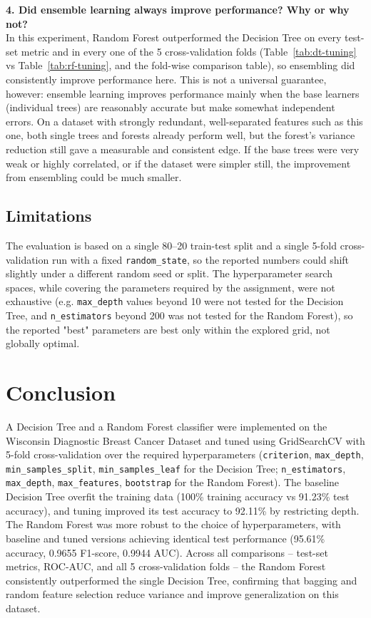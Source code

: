 \documentclass[12pt,a4paper]{article}
\begin{document}
\textbf{4. Did ensemble learning always improve performance? Why or why not?}\\
In this experiment, Random Forest outperformed the Decision Tree on every test-set metric and in every one of the 5 cross-validation folds (Table~\ref{tab:dt-tuning} vs Table~\ref{tab:rf-tuning}, and the fold-wise comparison table), so ensembling did consistently improve performance here. This is not a universal guarantee, however: ensemble learning improves performance mainly when the base learners (individual trees) are reasonably accurate but make somewhat independent errors. On a dataset with strongly redundant, well-separated features such as this one, both single trees and forests already perform well, but the forest's variance reduction still gave a measurable and consistent edge. If the base trees were very weak or highly correlated, or if the dataset were simpler still, the improvement from ensembling could be much smaller.

\subsection{Limitations}
The evaluation is based on a single 80--20 train-test split and a single 5-fold cross-validation run with a fixed \texttt{random\_state}, so the reported numbers could shift slightly under a different random seed or split. The hyperparameter search spaces, while covering the parameters required by the assignment, were not exhaustive (e.g. \texttt{max\_depth} values beyond 10 were not tested for the Decision Tree, and \texttt{n\_estimators} beyond 200 was not tested for the Random Forest), so the reported "best" parameters are best only within the explored grid, not globally optimal.

\section{Conclusion}
A Decision Tree and a Random Forest classifier were implemented on the Wisconsin Diagnostic Breast Cancer Dataset and tuned using GridSearchCV with 5-fold cross-validation over the required hyperparameters (\texttt{criterion}, \texttt{max\_depth}, \texttt{min\_samples\_split}, \texttt{min\_samples\_leaf} for the Decision Tree; \texttt{n\_estimators}, \texttt{max\_depth}, \texttt{max\_features}, \texttt{bootstrap} for the Random Forest). The baseline Decision Tree overfit the training data (100\% training accuracy vs 91.23\% test accuracy), and tuning improved its test accuracy to 92.11\% by restricting depth. The Random Forest was more robust to the choice of hyperparameters, with baseline and tuned versions achieving identical test performance (95.61\% accuracy, 0.9655 F1-score, 0.9944 AUC). Across all comparisons -- test-set metrics, ROC-AUC, and all 5 cross-validation folds -- the Random Forest consistently outperformed the single Decision Tree, confirming that bagging and random feature selection reduce variance and improve generalization on this dataset.
\end{document}
